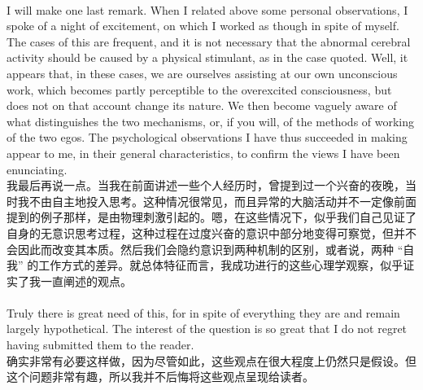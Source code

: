 \documentclass{article}
\begin{document}
\\
I will make one last remark. When I related above some personal observations, I spoke of a night of excitement, on which I worked as though in spite of myself. The cases of this are frequent, and it is not necessary that the abnormal cerebral activity should be caused by a physical stimulant, as in the case quoted. Well, it appears that, in these cases, we are ourselves assisting at our own unconscious work, which becomes partly perceptible to the overexcited consciousness, but does not on that account change its nature. We then become vaguely aware of what distinguishes the two mechanisms, or, if you will, of the methods of working of the two egos. The psychological observations I have thus succeeded in making appear to me, in their general characteristics, to confirm the views I have been enunciating. \\
我最后再说一点。当我在前面讲述一些个人经历时，曾提到过一个兴奋的夜晚，当时我不由自主地投入思考。这种情况很常见，而且异常的大脑活动并不一定像前面提到的例子那样，是由物理刺激引起的。嗯，在这些情况下，似乎我们自己见证了自身的无意识思考过程，这种过程在过度兴奋的意识中部分地变得可察觉，但并不会因此而改变其本质。然后我们会隐约意识到两种机制的区别，或者说，两种 “自我” 的工作方式的差异。就总体特征而言，我成功进行的这些心理学观察，似乎证实了我一直阐述的观点。\\  

\\
Truly there is great need of this, for in spite of everything they are and remain largely hypothetical. The interest of the question is so great that I do not regret having submitted them to the reader.\\
确实非常有必要这样做，因为尽管如此，这些观点在很大程度上仍然只是假设。但这个问题非常有趣，所以我并不后悔将这些观点呈现给读者。\\  
\end{document}
